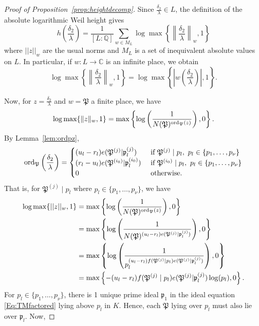 \begin{proof}[Proof of Proposition~\ref{prop:heightdecomp}]Since $\frac{\delta_2}{\lambda} \in L$, the definition of the absolute logarithmic Weil height gives
\[h\left(\frac{\delta_2}{\lambda}\right)=\frac{1}{[L:\mathbb{Q}]}\sum_{w \in M_L} \log \max \left\{ \left\|\frac{\delta_2}{\lambda}\right\|_{w}, 1\right\}\]
where $||z||_w$ are the usual norms and $M_L$ is a set of inequivalent absolute values on $L$. In particular, if $w: L \to \mathbb{C}$ is an infinite place, we obtain
\[ \log \max \left\{ \left\|\frac{\delta_2}{\lambda}\right\|_{w}, 1\right\} = \log \max \left\{ \left|w\left(\frac{\delta_2}{\lambda}\right)\right|, 1\right\}.\]

Now, for $z = \frac{\delta_2}{\lambda}$ and $w = \mathfrak{P}$ a finite place, we have
\[ \log \max \{ \|z\|_{w}, 1\} = \max \left\{ \log\left(\frac{1}{N(\mathfrak{P})^{\operatorname{ord}_{\mathfrak{P}}(z)}} \right), 0\right\}. \]
By Lemma~\ref{lem:ordpz}, 
\[\operatorname{ord}_{\mathfrak{P}}\left( \frac{\delta_2}{\lambda}\right)=
\begin{cases}
(u_l - r_l)e(\mathfrak{P}^{(j)}|\mathfrak{p}_l^{(j)})	
	& \textnormal{ if } \mathfrak{P}^{(j)} \mid p_l , \ p_l \in \{p_1,\dots, p_{\nu}\}\\
(r_l - u_l)e(\mathfrak{P}^{(i_0)}|\mathfrak{p}_l^{(i_0)})
	& \textnormal{ if } \mathfrak{P}^{(i_0)}\mid p_l, \ p_l \in \{p_1,\dots, p_{\nu}\}\\
0 	& \textnormal{ otherwise}.
\end{cases}\]
That is, for $\mathfrak{P}^{(j)}\mid p_l$ where $p_l \in \{p_1, \dots, p_{\nu}\}$, we have
\begin{align*}
 \log \max \{ ||z||_{w}, 1\}	
 	& = \max \left\{ \log\left(\frac{1}{N(\mathfrak{P})^{\operatorname{ord}_{\mathfrak{P}}(z)}} \right), 0\right\}\\
	& = \max \left\{ \log\left(\frac{1}{N(\mathfrak{P})^{(u_l - r_l)e(\mathfrak{P}^{(j)}|\mathfrak{p}_l^{(j)})}} \right), 0\right\}\\
	& = \max \left\{ \log\left(\frac{1}{p_l^{(u_l - r_l)f(\mathfrak{P}^{(j)}\mid p_l)e(\mathfrak{P}^{(j)}|\mathfrak{p}_l^{(j)})}} \right), 0\right\}\\
	& = \max \left\{ -(u_l - r_l)f(\mathfrak{P}^{(j)}\mid p_l)e(\mathfrak{P}^{(j)}|\mathfrak{p}_l^{(j)})\log(p_l), 0\right\}.
\end{align*}
For $p_l \in \{p_1, \dots, p_{\nu}\}$, there is 1 unique prime ideal $\mathfrak{p}_1$ in the ideal equation \eqref{Eq:TMfactored} lying above $p_l$ in $K$. Hence, each $\mathfrak{P}$ lying over $p_l$ must also lie over $\mathfrak{p}_l$. Now, 

\end{proof}

